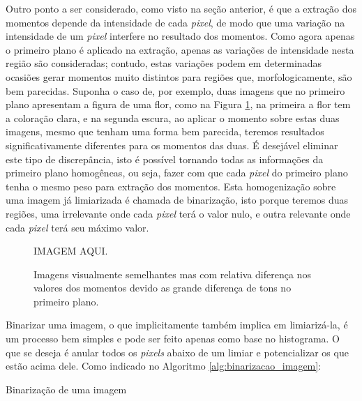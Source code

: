 Outro ponto a ser considerado, como visto na seção anterior, é que
a extração dos momentos depende da intensidade de
cada \textit{pixel}, de modo que uma variação na intensidade de um \textit{pixel}
interfere no resultado dos momentos. Como agora apenas o primeiro plano é
aplicado na extração, apenas as variações de intensidade nesta região são
consideradas; contudo, estas variações podem em determinadas ocasiões gerar
momentos muito distintos para regiões que, morfologicamente, são bem parecidas.
Suponha o caso de, por exemplo, duas imagens que no primeiro plano apresentam a
figura de uma flor, como na Figura \ref{fig:flor_mmt}, na primeira a flor
tem a coloração clara, e na segunda escura, ao aplicar o momento sobre estas
duas imagens, mesmo que tenham uma forma bem parecida, teremos resultados
significativamente diferentes para os momentos das duas. É desejável eliminar
este tipo de discrepância, isto é possível tornando todas as informações da
primeiro plano homogêneas, ou seja, fazer com que cada \textit{pixel} do
primeiro plano tenha o mesmo peso para extração dos momentos. Esta homogenização
sobre uma imagem já limiarizada é chamada de
binarização, isto porque teremos duas regiões, uma irrelevante onde
cada \textit{pixel} terá o valor nulo, e outra relevante onde cada \textit{pixel}
terá seu máximo valor.

\begin{figure}[H]
  \begin{center}
    IMAGEM AQUI.
  \end{center}
  \caption{ Imagens visualmente semelhantes mas com relativa diferença nos
    valores dos momentos devido as grande diferença de tons no primeiro plano. }
  \label{fig:flor_mmt}
\end{figure}

Binarizar uma imagem, o que implicitamente também implica em limiarizá-la, é
um processo bem simples e pode ser feito apenas como base no histograma. O que
se deseja é anular todos os \textit{pixels} abaixo de um limiar e
potencializar os que estão acima dele. Como indicado no Algoritmo \ref{alg:binarizacao_imagem}:

\begin{algorithm}[H]
\caption{Binarização de uma imagem}\label{alg:binarizacao_imagem}
\end{algorithm}


